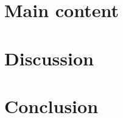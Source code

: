 \documentclass[conference]{IEEEtran}
\begin{document}
\section{Main content} %


\section{Discussion}

\section{Conclusion}





\end{document}
